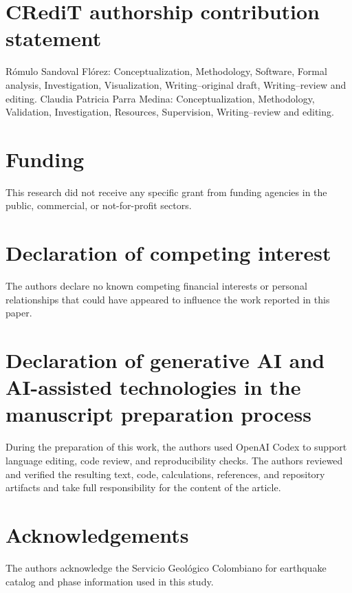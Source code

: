 \documentclass[10pt]{article}
\begin{document}
\section*{CRediT authorship contribution statement}
R\'omulo Sandoval Fl\'orez: Conceptualization, Methodology, Software, Formal analysis, Investigation, Visualization, Writing--original draft, Writing--review and editing. Claudia Patricia Parra Medina: Conceptualization, Methodology, Validation, Investigation, Resources, Supervision, Writing--review and editing.

\section*{Funding}
This research did not receive any specific grant from funding agencies in the public, commercial, or not-for-profit sectors.

\section*{Declaration of competing interest}
The authors declare no known competing financial interests or personal relationships that could have appeared to influence the work reported in this paper.

\section*{Declaration of generative AI and AI-assisted technologies in the manuscript preparation process}
During the preparation of this work, the authors used OpenAI Codex to support language editing, code review, and reproducibility checks. The authors reviewed and verified the resulting text, code, calculations, references, and repository artifacts and take full responsibility for the content of the article.

\section*{Acknowledgements}
The authors acknowledge the Servicio Geol\'ogico Colombiano for earthquake catalog and phase information used in this study.



\end{document}
